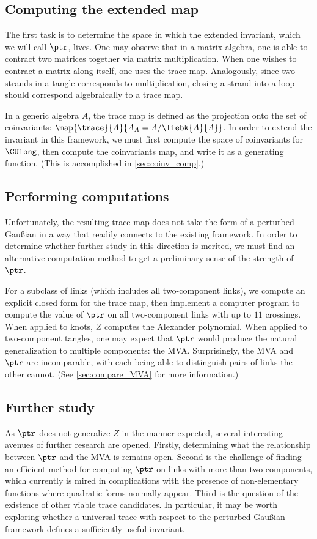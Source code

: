 \subsection{Computing the extended map}
The first task is to determine the space in which the extended invariant, which
we will call $\ptr$, lives. One may observe that in a matrix algebra, one is
able to contract two matrices together via matrix multiplication. When one
wishes to contract a matrix along itself, one uses the trace map. Analogously,
since two strands in a tangle corresponds to multiplication, closing a strand
into a loop should correspond algebraically to a trace map.

In a generic algebra $A$, the trace map is defined as the projection onto the
set of coinvariants: $\map {\trace} {A} {A_A = A/\liebk{A}{A}}$. In order to
extend the invariant in this framework, we must first compute the space of
coinvariants for $\CUlong$, then compute the coinvariants map, and write it as a
generating function. (This is accomplished in \cref{sec:coinv_comp}.)

\subsection{Performing computations}
Unfortunately, the resulting trace map does not take the form of a perturbed
Gaußian in a way that readily connects to the existing framework. In order to
determine whether further study in this direction is merited, we must find an
alternative computation method to get a preliminary sense of the strength of
$\ptr$.

For a subclass of links (which includes all two-component links), we compute an
explicit closed form for the trace map, then implement a computer program to
compute the value of $\ptr$ on all two-component links with up to $11$
crossings. When applied to knots, $Z$ computes the Alexander
polynomial. When applied to two-component
tangles, one may expect that $\ptr$ would produce the natural generalization to
multiple components: the \ac{MVA}. Surprisingly, the \ac{MVA} and $\ptr$ are
incomparable, with each being able to distinguish pairs of links the other
cannot. (See \cref{sec:compare_MVA} for more information.)

\subsection{Further study}
As $\ptr$ does not generalize $Z$ in the manner expected, several interesting
avenues of further research are opened. Firstly, determining what the
relationship between $\ptr$ and the \ac{MVA} is remains open. Second is the
challenge of finding an efficient method for computing $\ptr$ on links with more
than two components, which currently is mired in complications with
the presence of non-elementary functions where quadratic forms normally appear.
Third is the question of the existence of other viable trace candidates. In
particular, it may be worth exploring whether a universal trace with respect to
the perturbed Gaußian framework defines a sufficiently useful invariant.
